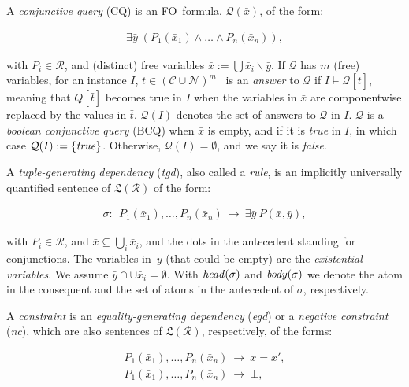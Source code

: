\documentclass[format=acmsmall, review=false, screen=true]{acmart}
\newcommand{\bcq}{BCQ}
\newcommand{\cq}{CQ}
\newcommand{\mc}[1]{\mathcal{ #1}}
\newcommand{\mf}[1]{\mathfrak{ #1}}
\newcommand{\nit}[1]{{\it #1}}
\newcommand{\schema}{\mc{R}}
\newcommand{\m}{\;\!\!}
\newcommand{\fo}{FO}
\newcommand{\vectt}[1]{\bar{#1}}
\newcommand{\egd}{{\em egd}}
\newcommand{\tgd}{{\em tgd}}
\newcommand{\red}[1]{{#1}}
\begin{document}
A {\em conjunctive query} (\cq) is an \fo \ formula,  $\mc{Q}(\vectt{x})$, of the form:

\vspace{-3mm}
\begin{align}\label{frm:cq}\exists  \vectt{y}\;(P_1(\vectt{x}_1)\wedge \dots \wedge P_n(\vectt{x}_n)),\end{align}
\vspace{-3mm}

\noindent with \red{$P_i \in \mc{R}$,} and (distinct) free variables $\vectt{x} := \bigcup \vectt{x}_i \smallsetminus \vectt{y}$. If $\mc{Q}$ has $m$ (free) variables, for an instance $I$, $\vectt{t} \in (\mc{C} \cup \mc{N})^m$ \ is an {\em answer} to $\mc{Q}$ if $I \models \mc{Q}[\vectt{t}]$, meaning that  $Q[\vectt{t}]$ becomes true in $I$  when the variables in $\vectt{x}$ are componentwise replaced by the values in $\vectt{t}$. $\mc{Q}(I)$ denotes the set of answers to $\mc{Q}$ in $I$. $\mc{Q}$ is a {\em boolean conjunctive query} (\bcq) when $\vectt{x}$ is empty, and if it is {\em true} in $I$, in which case $\mc{Q}(I) := \{\nit{true}\}$. Otherwise, $\mc{Q}(I) = \emptyset$, and we say it is
{\em false}.

A {\em tuple-generating dependency} (\tgd), also called  a {\em rule}, is an implicitly universally quantified  sentence of $\mf{L}(\schema)$ of the form:

\vspace{-4mm}
\begin{align}\sigma\!: \ \ P_1(\vectt{x}_1), \ldots, P_n(\vectt{x}_n) \ \rightarrow \ \exists \vectt{y} \ P(\vectt{x},\vectt{y}),\label{frm:tgd}\end{align}
\vspace{-4mm}

\noindent  with \red{$P_i \in \mc{R}$, and} $\bar{x} \subseteq \bigcup_i \bar{x}_i$, and the dots in the antecedent standing for conjunctions. The variables in~$\vectt{y}$ (that could be empty) are the {\em existential variables}. We assume $\vectt{y}\cap \cup \vectt{x}_i=\emptyset$. With ${\it head}(\sigma)$ and ${\it body}(\sigma)$ we denote the atom in the consequent and the set of atoms in the antecedent of $\sigma$, respectively.

A {\em constraint} is an {\em equality-generating dependency} (\egd\;\m) or a {\em negative constraint} ({\em nc}), which are also sentences of $\mf{L}(\schema)$, respectively, of the forms:

\vspace{-3mm}
\begin{align}
P_1(\vectt{x}_1), \ldots, P_n(\vectt{x}_n) \ \rightarrow \  x=x',\label{frm:egd}\\
P_1(\vectt{x}_1), \ldots, P_n(\vectt{x}_n) \ \rightarrow \ \bot,\label{frm:nc}
\end{align}
\vspace{-3mm}
\end{document}
